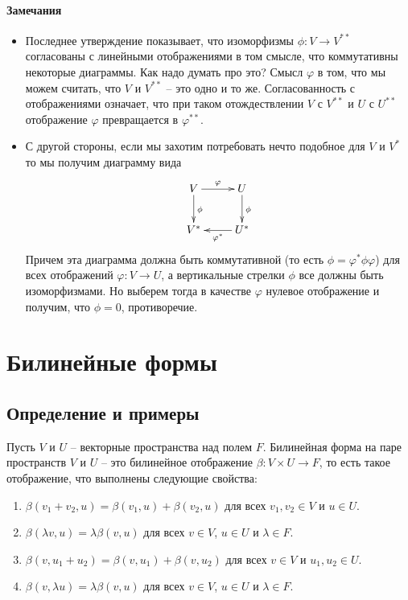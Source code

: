 \paragraph{Замечания}
\begin{itemize}
\item Последнее утверждение показывает, что изоморфизмы $\phi\colon V\to V^{**}$ согласованы с линейными отображениями в том смысле, что коммутативны некоторые диаграммы.
Как надо думать про это?
Смысл $\varphi$ в том, что мы можем считать, что $V$ и $V^{**}$ -- это одно и то же.
Согласованность с отображениями означает, что при таком отождествлении $V$ с $V^{**}$ и $U$ с $U^{**}$ отображение $\varphi$ превращается в $\varphi^{**}$.

\item С другой стороны, если мы захотим потребовать нечто подобное для $V$ и $V^*$ то мы получим диаграмму вида
\[
\xymatrix{
	{V}\ar[r]^{\varphi}\ar[d]^{\phi}&{U}\ar[d]^{\phi}\\
	{V^*}&{U^*}\ar[l]^{\varphi^*}
}
\]
Причем эта диаграмма должна быть коммутативной (то есть $\phi = \varphi^*\phi\varphi$) для всех отображений $\varphi\colon V\to U$, а вертикальные стрелки $\phi$ все должны быть изоморфизмами.
Но выберем тогда в качестве $\varphi$ нулевое отображение и получим, что $\phi = 0$, противоречие.
\end{itemize}



\newpage
\section{Билинейные формы}

\subsection{Определение и примеры}

\begin{definition}
\label{def::BilinearForms}
Пусть $V$ и $U$ -- векторные пространства над полем $F$.
Билинейная форма на паре пространств $V$ и $U$ -- это билинейное отображение $\beta\colon V\times U \to F$, то есть такое отображение, что выполнены следующие свойства:
\begin{enumerate}
\item $\beta(v_1 + v_2, u) = \beta(v_1,u) + \beta(v_2,u)$ для всех $v_1,v_2\in V$ и $u\in U$.

\item $\beta(\lambda v, u) = \lambda \beta(v,u)$ для всех $v\in V$, $u\in U$ и $\lambda\in F$.

\item $\beta(v, u_1+u_2) = \beta(v, u_1) + \beta(v,u_2)$ для всех $v\in V$ и $u_1,u_2\in U$.

\item $\beta(v,\lambda u) = \lambda\beta(v,u)$ для всех $v\in V$, $u\in U$ и $\lambda\in F$.
\end{enumerate}
\end{definition}

